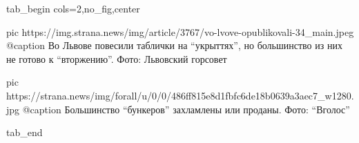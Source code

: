  
 
 
 
 


\ifcmt
  tab_begin cols=2,no_fig,center

     pic https://img.strana.news/img/article/3767/vo-lvove-opublikovali-34_main.jpeg
		 @caption Во Львове повесили таблички на \enquote{укрыттях}, но большинство из них не готово к \enquote{вторжению}. Фото: Львовский горсовет 

		 pic https://strana.news/img/forall/u/0/0/486ff815e8d1fbfc6de18b0639a3aec7_w1280.jpg
		 @caption Большинство \enquote{бункеров} захламлены или проданы. Фото: \enquote{Вголос}

  tab_end
\fi

